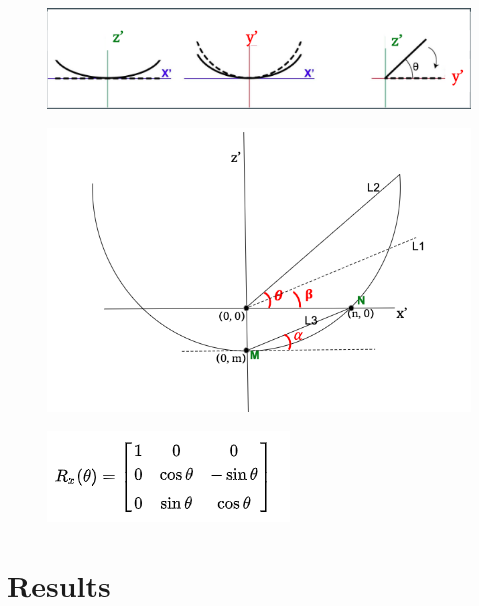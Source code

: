 \documentclass[10pt,letterpaper]{article}
\begin{document}
\begin{figure}[H]
\includegraphics[width=0.9\linewidth]{visualization_paper/error_correctionB} \end{figure}

\begin{figure}[H]
\includegraphics[width=0.9\linewidth]{visualization_paper/rotation_angle} \end{figure}

\begin{figure}[H]
\includegraphics[width=0.5\linewidth]{visualization_paper/rotation_matrix} \end{figure}

\hypertarget{results}{%
\section{Results}\label{results}}
\end{document}
